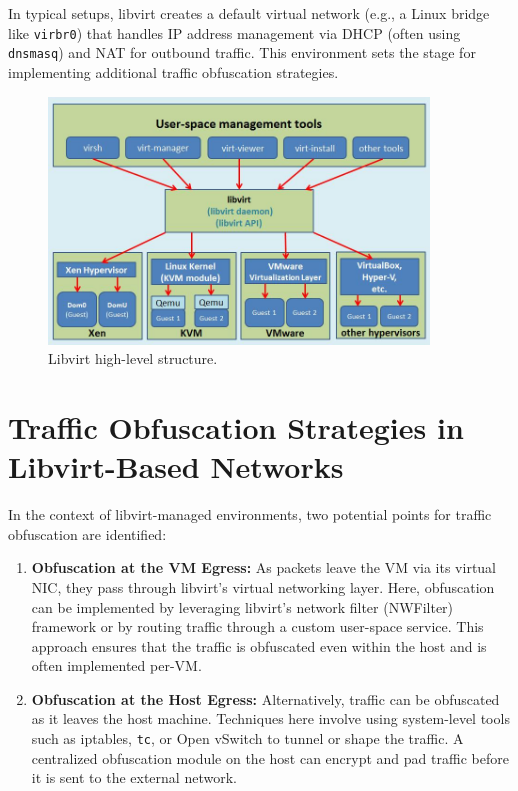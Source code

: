 \documentclass{article}
\begin{document}
In typical setups, libvirt creates a default virtual network (e.g., a Linux bridge like \texttt{virbr0}) that handles IP address management via DHCP (often using \texttt{dnsmasq}) and NAT for outbound traffic. This environment sets the stage for implementing additional traffic obfuscation strategies.

\begin{figure}[h]
\caption{Libvirt high-level structure.}
\centering
\includegraphics[width=0.9\textwidth]{libvirt.png}
\end{figure}

\section{Traffic Obfuscation Strategies in Libvirt-Based Networks}
In the context of libvirt-managed environments, two potential points for traffic obfuscation are identified:
\begin{enumerate}[label=\arabic*.]
    \item \textbf{Obfuscation at the VM Egress:} As packets leave the VM via its virtual NIC, they pass through libvirt’s virtual networking layer. Here, obfuscation can be implemented by leveraging libvirt’s network filter (NWFilter) framework or by routing traffic through a custom user-space service. This approach ensures that the traffic is obfuscated even within the host and is often implemented per-VM.
    \item \textbf{Obfuscation at the Host Egress:} Alternatively, traffic can be obfuscated as it leaves the host machine. Techniques here involve using system-level tools such as iptables, \texttt{tc}, or Open vSwitch to tunnel or shape the traffic. A centralized obfuscation module on the host can encrypt and pad traffic before it is sent to the external network.
\end{enumerate}
\end{document}
